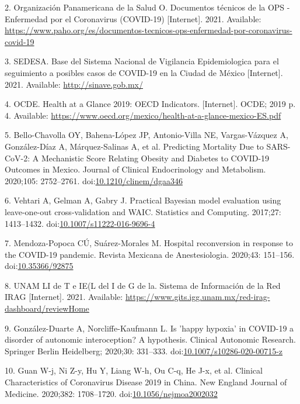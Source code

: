 \documentclass[10pt,letterpaper]{article}
\begin{document}
\hypertarget{ref-OrganizacionPanamericanadelaSalud2021}{}
2. Organización Panamericana de la Salud O. Documentos técnicos de la
OPS - Enfermedad por el Coronavirus (COVID-19) {[}Internet{]}. 2021.
Available:
\url{https://www.paho.org/es/documentos-tecnicos-ops-enfermedad-por-coronavirus-covid-19}

\hypertarget{ref-SEDESA2021}{}
3. SEDESA. Base del Sistema Nacional de Vigilancia Epidemiologica para
el seguimiento a posibles casos de COVID-19 en la Ciudad de México
{[}Internet{]}. 2021. Available: \url{http://sinave.gob.mx/}

\hypertarget{ref-OCDE2019}{}
4. OCDE. Health at a Glance 2019: OECD Indicators. {[}Internet{]}. OCDE;
2019 p. 4. Available:
\url{https://www.oecd.org/mexico/health-at-a-glance-mexico-ES.pdf}

\hypertarget{ref-Bello-Chavolla2020}{}
5. Bello-Chavolla OY, Bahena-López JP, Antonio-Villa NE, Vargas-Vázquez
A, González-Díaz A, Márquez-Salinas A, et al. Predicting Mortality Due
to SARS-CoV-2: A Mechanistic Score Relating Obesity and Diabetes to
COVID-19 Outcomes in Mexico. Journal of Clinical Endocrinology and
Metabolism. 2020;105: 2752--2761.
doi:\href{https://doi.org/10.1210/clinem/dgaa346}{10.1210/clinem/dgaa346}

\hypertarget{ref-Vehtari2017}{}
6. Vehtari A, Gelman A, Gabry J. Practical Bayesian model evaluation
using leave-one-out cross-validation and WAIC. Statistics and Computing.
2017;27: 1413--1432.
doi:\href{https://doi.org/10.1007/s11222-016-9696-4}{10.1007/s11222-016-9696-4}

\hypertarget{ref-Mendoza-Popoca2020}{}
7. Mendoza-Popoca CÚ, Suárez-Morales M. Hospital reconversion in
response to the COVID-19 pandemic. Revista Mexicana de Anestesiologia.
2020;43: 151--156.
doi:\href{https://doi.org/10.35366/92875}{10.35366/92875}

\hypertarget{ref-UNAM2021}{}
8. UNAM LI de T e IE(L del I de G de la. Sistema de Información de la
Red IRAG {[}Internet{]}. 2021. Available:
\url{https://www.gits.igg.unam.mx/red-irag-dashboard/reviewHome}

\hypertarget{ref-Gonzalez-Duarte2020}{}
9. González-Duarte A, Norcliffe-Kaufmann L. Is 'happy hypoxia' in
COVID-19 a disorder of autonomic interoception? A hypothesis. Clinical
Autonomic Research. Springer Berlin Heidelberg; 2020;30: 331--333.
doi:\href{https://doi.org/10.1007/s10286-020-00715-z}{10.1007/s10286-020-00715-z}

\hypertarget{ref-Guan2020}{}
10. Guan W-j, Ni Z-y, Hu Y, Liang W-h, Ou C-q, He J-x, et al. Clinical
Characteristics of Coronavirus Disease 2019 in China. New England
Journal of Medicine. 2020;382: 1708--1720.
doi:\href{https://doi.org/10.1056/nejmoa2002032}{10.1056/nejmoa2002032}

\nolinenumbers
\end{document}

